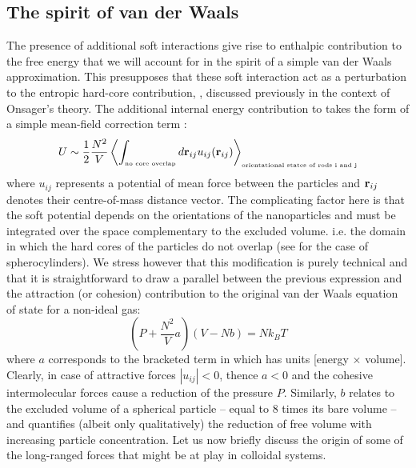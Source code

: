 \documentclass[amssymb]{revtex4}
\begin{document}
\subsection{The spirit of van der Waals}

The presence of additional soft interactions give rise to enthalpic contribution to the free energy that we will account for in the spirit of a simple van der Waals approximation. This presupposes that these soft interaction act as a perturbation to the entropic hard-core contribution, ,  discussed previously in the context of Onsager's theory.  The additional internal energy contribution to  takes the form of a simple mean-field correction term \cite{cotter1977,cotter1979,gelbartbaron,vargachiral2006,francomelgar2008}:
\begin{equation}
U \sim  \frac{1}{2} \frac{N^{2}}{V} \left \langle \int_{\mbox{\tiny no core overlap}} d {\bf r}_{ij}  u_{ij}({\bf r}_{ij})  \right \rangle_{\mbox{\tiny orientational states of rods i and j}} 
\label{uvdw}
\end{equation}
where $u_{ij}$ represents a potential of mean force  between the particles and ${\bf r}_{ij}$ denotes their centre-of-mass distance vector. The complicating factor here is that the soft potential depends on the orientations of the nanoparticles and must be integrated over the space complementary to the excluded volume. i.e.  the domain in which the hard cores of the particles do not overlap (see  for the case of spherocylinders).   We stress however that this modification is purely technical and that it is straightforward to draw a parallel between the previous expression and the attraction (or cohesion) contribution to the original van der Waals equation of state for a non-ideal gas:
\begin{equation}
\left ( P + \frac{N^{2}}{V}a \right ) (V - Nb) = Nk_{B}T
\end{equation} 
where $a$ corresponds to the bracketed term in  which has units [energy $\times$ volume].  Clearly, in case of attractive forces $|  u_{ij} | <0$,  thence $a<0$ and the cohesive intermolecular forces cause a reduction of the pressure $P$. Similarly, $b$ relates to the excluded volume of a spherical particle -- equal to 8 times its bare volume -- and quantifies (albeit only qualitatively) the reduction of free volume with increasing particle concentration. Let us now briefly discuss the origin of some of the long-ranged forces that might be at play in colloidal systems.  
\end{document}

